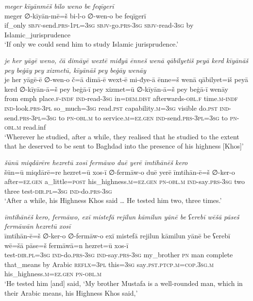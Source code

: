 \ea \label{ŽP.78}
\textit{meger kīyānmēš bilo weno be feqīgerī} \\ 
\gll meger ∅-kīyān-mē=š bi-l-o ∅-wen-o be feqīgerī \\ 
 if\_only \textsc{sbjv-}send\textsc{.prs}\textsc{-1pl}\textsc{=3sg} \textsc{sbjv-}go\textsc{.prs}\textsc{-3sg} \textsc{sbjv-}read\textsc{-3sg} by Islamic\_jurisprudence \\ 
\glt `If only we could send him to study Islamic jurisprudence.'
\z 
 
\ea \label{ŽP.80}
\textit{je her yāgē weno, čā dimāyē wextē miđyā ēnneš wenā qābilyetiš peyā kerd kīyānāš pey beġāy pey xizmetū, kīyānāš pey beġāy wenāy} \\ 
\gll je her yāgē-ē ∅-wen-o č=ā dimā-ē wext-ē mi-đye-ā ēnne=š wenā qābilyet=iš peyā kerd ∅-kīyān-ā=š pey beġā-ī pey xizmet=ū ∅-kīyān-ā=š pey beġā-ī wenāy \\ 
 from emph place\textsc{.f}\textsc{-indf} \textsc{ind-}read\textsc{-3sg} in=\textsc{dem.dist} afterwards\textsc{-obl}\textsc{.f} time\textsc{.m}\textsc{-indf} \textsc{ind-}look\textsc{.prs}\textsc{-3pl} so\_much\textsc{=3sg} read\textsc{.pst} capability\textsc{.m}\textsc{=3sg} visible do\textsc{.pst} \textsc{ind-}send\textsc{.prs}\textsc{-3pl}\textsc{=3sg} to \textsc{pn}\textsc{-obl}\textsc{.m} to service\textsc{.m}\textsc{\textsc{=ez.gen}} \textsc{ind-}send\textsc{.prs}\textsc{-3pl}\textsc{=3sg} to \textsc{pn}\textsc{-obl}\textsc{.m} read.inf \\ 
\glt `Wherever he studied, after a while, they realised that he studied to the extent that he deserved to be sent to Baghdad into the presence of his highness [Khos]'
\z 
 
\ea \label{ŽP.82}
\textit{šūnū miqdārēre hezretū xosī fermāwo duē yerē īmtihānēš kero} \\ 
\gll šūn=ū miqdārē=re hezret=ū xos-ī ∅-fermāw-o duē yerē īmtihān-ē=š ∅-ker-o \\ 
 after\textsc{\textsc{=ez.gen}} a\_little\textsc{=\textsc{post}} his\_highness\textsc{.m}\textsc{\textsc{=ez.gen}} \textsc{pn}\textsc{-obl}\textsc{.m} \textsc{ind-}say\textsc{.prs}\textsc{-3sg} two three test\textsc{-dir}\textsc{.pl}\textsc{=3sg} \textsc{ind-}do\textsc{.prs}\textsc{-3sg} \\ 
\glt `After a while, his Highness Khos said … He tested him two, three times.'
\z 
 
\ea \label{ŽP.83}
\textit{īmtihānēš kero, fermāwo, exī mistefā rejilun kāmilun yānē be ʕerebī wēšā pāseš fermāwān hezretū xosī} \\ 
\gll īmtihān-ē=š ∅-ker-o ∅-fermāw-o exī mistefā rejilun kāmilun yānē be ʕerebī wē=šā pāse=š fermāwā=n hezret=ū xos-ī \\ 
 test\textsc{-dir}\textsc{.pl}\textsc{=3sg} \textsc{ind-}do\textsc{.prs}\textsc{-3sg} \textsc{ind-}say\textsc{.prs}\textsc{-3sg} my\_brother \textsc{pn} man complete that\_means by Arabic \textsc{reflx}\textsc{=3pl} this\textsc{=3sg} say\textsc{.pst}\textsc{.ptcp}\textsc{.m}\textsc{=cop}\textsc{.3sg}\textsc{.m} his\_highness\textsc{.m}\textsc{\textsc{=ez.gen}} \textsc{pn}\textsc{-obl}\textsc{.m} \\ 
\glt `He tested him [and] said, ‘My brother Mustafa is a well-rounded man, which in their Arabic means, his Highness Khos said,'
\z 
 
